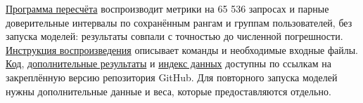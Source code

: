 \documentclass[11pt,a4paper]{article}
\begin{document}
\href{https://github.com/suprend/kion-rl-recsys/blob/5c6858e46705fb4baa350d36914905b061376ed3/reproduction/saved_metrics64k.py}{Программа пересчёта} воспроизводит метрики на 65 536 запросах и парные доверительные интервалы по сохранённым рангам и группам пользователей, без запуска моделей: результаты совпали с точностью до численной погрешности. \href{https://github.com/suprend/kion-rl-recsys/blob/5c6858e46705fb4baa350d36914905b061376ed3/REPRODUCING.md}{Инструкция воспроизведения} описывает команды и необходимые входные файлы. \href{https://github.com/suprend/kion-rl-recsys/blob/5c6858e46705fb4baa350d36914905b061376ed3/source/README.md}{Код}, \href{https://github.com/suprend/kion-rl-recsys/blob/5c6858e46705fb4baa350d36914905b061376ed3/reports/REPORT.md}{дополнительные результаты} и \href{https://github.com/suprend/kion-rl-recsys/blob/5c6858e46705fb4baa350d36914905b061376ed3/evidence/INDEX.json}{индекс данных} доступны по ссылкам на закреплённую версию репозитория GitHub. Для повторного запуска моделей нужны дополнительные данные и веса, которые предоставляются отдельно.

\end{document}
